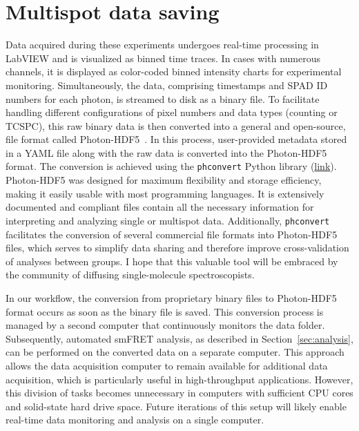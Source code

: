 \section{Multispot data saving}
\label{sec:data_saving}

Data acquired during these experiments undergoes real-time processing in LabVIEW and is visualized as binned time traces. 
In cases with numerous channels, it is displayed as color-coded binned intensity charts for experimental monitoring. 
Simultaneously, the data, comprising timestamps and \ac{SPAD} ID numbers for each photon, is streamed to disk as a binary file. 
To facilitate handling different configurations of pixel numbers and data types (counting or \ac{TCSPC}), this raw binary data is then converted into a general and open-source, file format called Photon-HDF5~\cite{ingargiola_BJ_2016, ingargiola_SPIE_2016}. 
In this process, user-provided metadata stored in a YAML file along with the raw data is converted into the Photon-HDF5 format. 
The conversion is achieved using the \texttt{phconvert} Python library (\href{https://photon-hdf5.github.io/phconvert/}{link}). 
Photon-HDF5 was designed for maximum flexibility and storage efficiency, making it easily usable with most programming languages.
It is extensively documented and compliant files contain all the necessary information for interpreting and analyzing single or multispot data. 
Additionally, \texttt{phconvert} facilitates the conversion of several commercial file formats into Photon-HDF5 files, which serves to simplify data sharing and therefore improve cross-validation of analyses between groups.
I hope that this valuable tool will be embraced by the community of diffusing single-molecule spectroscopists. 

In our workflow, the conversion from proprietary binary files to Photon-HDF5 format occurs as soon as the binary file is saved. 
This conversion process is managed by a second computer that continuously monitors the data folder. 
Subsequently, automated \ac{smFRET} analysis, as described in Section~\ref{sec:analysis}, can be performed on the converted data on a separate computer.  
This approach allows the data acquisition computer to remain available for additional data acquisition, which is particularly useful in high-throughput applications. 
However, this division of tasks becomes unnecessary in computers with sufficient CPU cores and solid-state hard drive space.
Future iterations of this setup will likely enable real-time data monitoring and analysis on a single computer.

